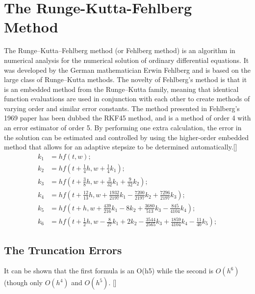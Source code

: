 \documentclass[12pt,oneside]{book}
\begin{document}
	\section{The Runge-Kutta-Fehlberg Method} \label{m:rkf}
		\begin{spacing}{1.2}
			
			The Runge–Kutta–Fehlberg method (or Fehlberg method) is an algorithm in numerical analysis for the numerical solution of ordinary differential equations. It was developed by the German mathematician Erwin Fehlberg and is based on the large class of Runge–Kutta methods.
			The novelty of Fehlberg's method is that it is an embedded method from the Runge–Kutta family, meaning that identical function evaluations are used in conjunction with each other to create methods of varying order and similar error constants. The method presented in Fehlberg's 1969 paper has been dubbed the RKF45 method, and is a method of order 4 with an error estimator of order 5. By performing one extra calculation, the error in the solution can be estimated and controlled by using the higher-order embedded method that allows for an adaptive stepsize to be determined automatically.[]
			\begin{equation}
				\begin{split}
					k_1 & = hf(t,w); \\
					k_2 & = hf(t + \frac{1}{4}h, w + \frac{1}{4}k_1); \\
					k_3 & = hf(t + \frac{3}{8}h, w + \frac{3}{32}k_1 + \frac{9}{32}k_2); \\ 
					k_4 & = hf(t + \frac{12}{13}h, w + \frac{1932}{2197}k_1 - \frac{7200}{2197}k_2 + \frac{7296}{2197}k_3); \\ 
					k_5 & = hf(t + h, w + \frac{439}{216}k_1 - 8k_2 + \frac{3680}{513}k_3 - \frac{845}{4104}k_4); \\
					k_6 & = hf(t + \frac{1}{2}h, w - \frac{8}{27}k_1 + 2k_2 - \frac{3544}{2565}k_3 + \frac{1859}{4104}k_4 - \frac{11}{40}k_5);
				\end{split}
			\end{equation}
			
			\subsection*{The Truncation Errors}
				It can be shown that the first formula is an O(h5) while the second is $ O(h^6) $ (though only $ O(h^4) $ and $ O(h^5) $. []
			

\end{spacing}
\end{document}
